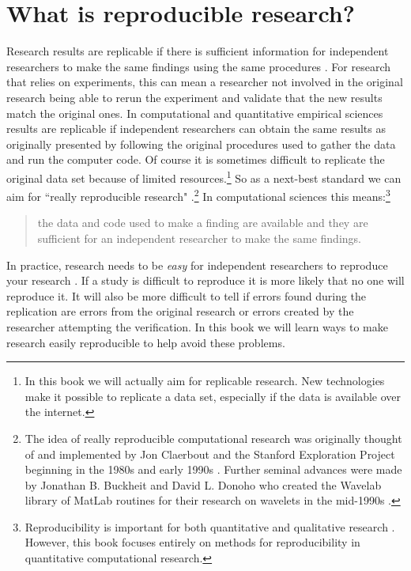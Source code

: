 \section{What is reproducible research?}

Research results are replicable if there is sufficient information for independent researchers to make the same findings using the same procedures \cite[444]{King1995}. For research that relies on experiments, this can mean a researcher not involved in the original research being able to rerun the experiment and validate that the new results match the original ones. In computational and quantitative empirical sciences results are replicable if independent researchers can obtain the same results as originally presented by following the original procedures used to gather the data and run the computer code. Of course it is sometimes difficult to replicate the original data set because of limited resources.\footnote{In this book we will actually aim for replicable research. New technologies make it possible to replicate a data set, especially if the data is available over the internet.} So as a next-best standard we can aim for ``really reproducible research" \cite[1226]{Peng2011}.\footnote{The idea of really reproducible computational research was originally thought of and implemented by Jon Claerbout and the Stanford Exploration Project beginning in the 1980s and early 1990s \cite[]{Fomel2009,Donoho2009}. Further seminal advances were made by Jonathan B. Buckheit and David L. Donoho who created the Wavelab library of MatLab routines for their research on wavelets in the mid-1990s \cite[]{Buckheit1995}.} In computational sciences this means:\footnote{Reproducibility is important for both quantitative and qualitative research \cite[]{King1994}. However, this book focuses entirely on methods for reproducibility in quantitative computational research.}

\begin{quote}
    the data and code used to make a finding are available and they are sufficient for an independent researcher to make the same findings.
\end{quote} 

In practice, research needs to be {\emph{easy}} for independent researchers to reproduce your research \cite[]{Ball2012}. If a study is difficult to reproduce it is more likely that no one will reproduce it. It will also be more difficult to tell if errors found during the replication are errors from the original research or errors created by the researcher attempting the verification. In this book we will learn ways to make research easily reproducible to help avoid these problems. 

